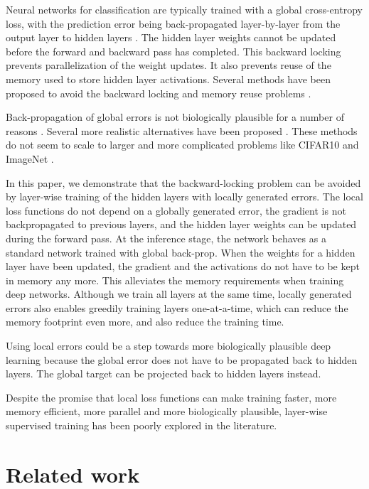 \documentclass{article}
\begin{document}
Neural networks for classification are typically trained with a global cross-entropy loss, with the prediction error being back-propagated layer-by-layer from the output layer to hidden layers \cite{Hinton86}. The hidden layer weights cannot be updated before the forward and backward pass has completed. This backward locking prevents parallelization of the weight updates. It also prevents reuse of the memory used to store hidden layer activations. Several methods have been proposed to avoid the backward locking and memory reuse problems \cite{JaderbergCOVGSK17,GomezRUG17}.

Back-propagation of global errors is not biologically plausible for a number of reasons \cite{BengioLBL15}. Several more realistic alternatives have been proposed \cite{Bengio14,LeeZFB15,LillicrapCTA14,Nokland16,ScellierB17}. These methods do not seem to scale to larger and more complicated problems like CIFAR10 and ImageNet \cite{Bartunov18}. 

In this paper, we demonstrate that the backward-locking problem can be avoided by layer-wise training of the hidden layers with locally generated errors. The local loss functions do not depend on a globally generated error, the gradient is not backpropagated to previous layers, and the hidden layer weights can be updated during the forward pass. At the inference stage, the network behaves as a standard network trained with global back-prop. When the weights for a hidden layer have been updated, the gradient and the activations do not have to be kept in memory any more. This alleviates the memory requirements when training deep networks. Although we train all layers at the same time, locally generated errors also enables greedily training layers one-at-a-time, which can reduce the memory footprint even more, and also reduce the training time.

Using local errors could be a step towards more biologically plausible deep learning because the global error does not have to be propagated back to hidden layers. The global target can be projected back to hidden layers instead.

Despite the promise that local loss functions can make training faster, more memory efficient, more parallel and more biologically plausible, layer-wise supervised training has been poorly explored in the literature.

\section{Related work}
\end{document}
